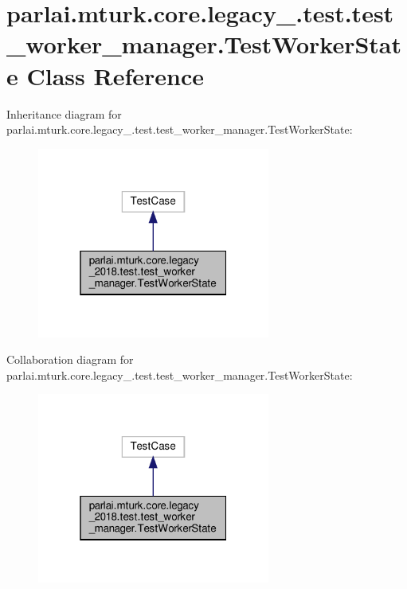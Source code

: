 \hypertarget{classparlai_1_1mturk_1_1core_1_1legacy__2018_1_1test_1_1test__worker__manager_1_1TestWorkerState}{}\section{parlai.\+mturk.\+core.\+legacy\+\_.\+test.\+test\+\_\+worker\+\_\+manager.\+Test\+Worker\+State Class Reference}
\label{classparlai_1_1mturk_1_1core_1_1legacy__2018_1_1test_1_1test__worker__manager_1_1TestWorkerState}


Inheritance diagram for parlai.\+mturk.\+core.\+legacy\+\_.\+test.\+test\+\_\+worker\+\_\+manager.\+Test\+Worker\+State\+:
\nopagebreak
\begin{figure}[H]
\begin{center}
\leavevmode
\includegraphics[width=217pt]{da/d81/classparlai_1_1mturk_1_1core_1_1legacy__2018_1_1test_1_1test__worker__manager_1_1TestWorkerState__inherit__graph}
\end{center}
\end{figure}


Collaboration diagram for parlai.\+mturk.\+core.\+legacy\+\_.\+test.\+test\+\_\+worker\+\_\+manager.\+Test\+Worker\+State\+:
\nopagebreak
\begin{figure}[H]
\begin{center}
\leavevmode
\includegraphics[width=217pt]{d6/d52/classparlai_1_1mturk_1_1core_1_1legacy__2018_1_1test_1_1test__worker__manager_1_1TestWorkerState__coll__graph}
\end{center}
\end{figure}
